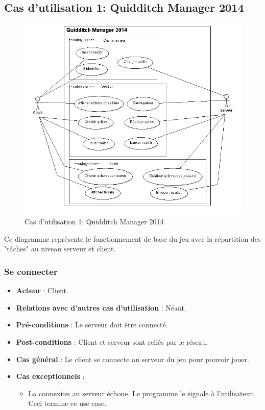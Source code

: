 \documentclass[a4paper,titlepage]{scrreprt}
\begin{document}
 \subsection{Cas d'utilisation 1: Quidditch Manager 2014}
  \begin{figure}[H]
    \center
    \includegraphics[scale=0.7]{uml/QM2014.png}
    \caption{Cas d'utilisation 1: Quidditch Manager 2014}
  \end{figure}	
    Ce diagramme représente le fonctionnement de base du jeu avec la répartition des "tâches" au niveau serveur et client.
    \subsubsection{Se connecter}
      \begin{itemize}
        \item \textbf{Acteur} : Client.
        \item \textbf{Relations avec d'autres cas d'utilisation}  : Néant.
        \item \textbf{Pré-conditions} : Le serveur doit être connecté.
        \item \textbf{Post-conditions} : Client et serveur sont reliés par le réseau.
        \item \textbf{Cas général} : Le client se connecte au serveur du jeu pour pouvoir jouer. 
        \item \textbf{Cas exceptionnels} : 
        \begin{itemize}
            \item La connexion au serveur échoue. Le programme le signale à l'utilisateur. Ceci termine ce use case.
          \end{itemize}
      \end{itemize}
\end{document}
